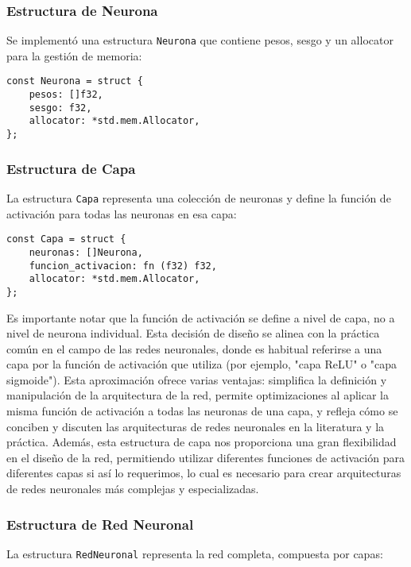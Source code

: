 \documentclass[twocolumn]{article}
\begin{document}
\subsubsection*{Estructura de Neurona}
Se implementó una estructura \texttt{Neurona} que contiene pesos, sesgo y un allocator para la gestión de memoria:

\begin{lstlisting}[style=customcode]
const Neurona = struct {
    pesos: []f32,
    sesgo: f32,
    allocator: *std.mem.Allocator,
};
\end{lstlisting}

\subsubsection*{Estructura de Capa}
La estructura \texttt{Capa} representa una colección de neuronas y define la función de activación para todas las neuronas en esa capa:

\begin{lstlisting}[style=customcode]
const Capa = struct {
    neuronas: []Neurona,
    funcion_activacion: fn (f32) f32,
    allocator: *std.mem.Allocator,
};
\end{lstlisting}

Es importante notar que la función de activación se define a nivel de capa, no a nivel de neurona individual. Esta decisión de diseño se alinea con la práctica común en el campo de las redes neuronales, donde es habitual referirse a una capa por la función de activación que utiliza (por ejemplo, "capa ReLU" o "capa sigmoide"). Esta aproximación ofrece varias ventajas: simplifica la definición y manipulación de la arquitectura de la red, permite optimizaciones al aplicar la misma función de activación a todas las neuronas de una capa, y refleja cómo se conciben y discuten las arquitecturas de redes neuronales en la literatura y la práctica. Además, esta estructura de capa nos proporciona una gran flexibilidad en el diseño de la red, permitiendo utilizar diferentes funciones de activación para diferentes capas si así lo requerimos, lo cual es necesario para crear arquitecturas de redes neuronales más complejas y especializadas.


\subsubsection*{Estructura de Red Neuronal}
La estructura \texttt{RedNeuronal} representa la red completa, compuesta por capas:
\end{document}
